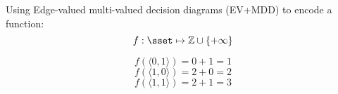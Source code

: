 
\vfill
Using Edge-valued multi-valued decision diagrams (EV+MDD) to encode a function: $$f: \sset \mapsto \mathbb{Z} \cup \{+\infty\}$$


$$f(\langle 0,1 \rangle)=0+1=1$$
$$f(\langle 1,0 \rangle)=2+0=2$$
$$f(\langle 1,1 \rangle)=2+1=3$$
\vfill
